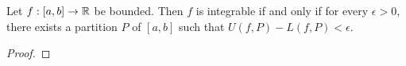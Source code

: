\documentclass[../main.tex]{subfiles}
\begin{document}
\begin{theorem}\label{trm:13.18}
    Let $f:[a,b]\to\mathbb{R}$ be bounded. Then $f$ is integrable if and only if for every $\epsilon>0$, there exists a partition $P$ of $[a,b]$ such that $U(f,P)-L(f,P)<\epsilon$.
    \begin{proof}




\end{proof}
\end{theorem}
\end{document}
